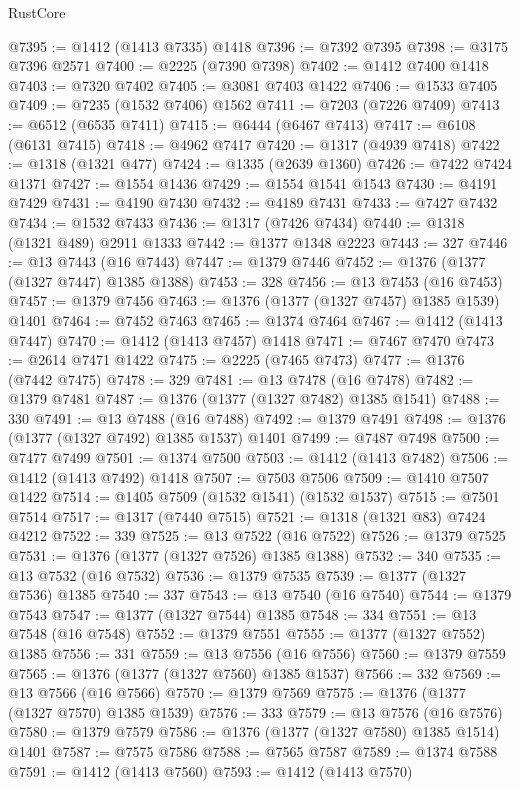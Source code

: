 \begin{lexlean}{RustCore}
\begin{coremodule}
@7395 := @1412 (@1413 @7335) @1418
@7396 := @7392 @7395
@7398 := @3175 @7396 @2571
@7400 := @2225 (@7390 @7398)
@7402 := @1412 @7400 @1418
@7403 := @7320 @7402
@7405 := @3081 @7403 @1422
@7406 := @1533 @7405
@7409 := @7235 (@1532 @7406) @1562
@7411 := @7203 (@7226 @7409)
@7413 := @6512 (@6535 @7411)
@7415 := @6444 (@6467 @7413)
@7417 := @6108 (@6131 @7415)
@7418 := @4962 @7417
@7420 := @1317 (@4939 @7418)
@7422 := @1318 (@1321 @477)
@7424 := @1335 (@2639 @1360)
@7426 := @7422 @7424 @1371
@7427 := @1554 @1436
@7429 := @1554 @1541 @1543
@7430 := @4191 @7429
@7431 := @4190 @7430
@7432 := @4189 @7431
@7433 := @7427 @7432
@7434 := @1532 @7433
@7436 := @1317 (@7426 @7434)
@7440 := @1318 (@1321 @489) @2911 @1333
@7442 := @1377 @1348 @2223
@7443 := 327
@7446 := @13 @7443 (@16 @7443)
@7447 := @1379 @7446
@7452 := @1376 (@1377 (@1327 @7447) @1385 @1388)
@7453 := 328
@7456 := @13 @7453 (@16 @7453)
@7457 := @1379 @7456
@7463 := @1376 (@1377 (@1327 @7457) @1385 @1539) @1401
@7464 := @7452 @7463
@7465 := @1374 @7464
@7467 := @1412 (@1413 @7447)
@7470 := @1412 (@1413 @7457) @1418
@7471 := @7467 @7470
@7473 := @2614 @7471 @1422
@7475 := @2225 (@7465 @7473)
@7477 := @1376 (@7442 @7475)
@7478 := 329
@7481 := @13 @7478 (@16 @7478)
@7482 := @1379 @7481
@7487 := @1376 (@1377 (@1327 @7482) @1385 @1541)
@7488 := 330
@7491 := @13 @7488 (@16 @7488)
@7492 := @1379 @7491
@7498 := @1376 (@1377 (@1327 @7492) @1385 @1537) @1401
@7499 := @7487 @7498
@7500 := @7477 @7499
@7501 := @1374 @7500
@7503 := @1412 (@1413 @7482)
@7506 := @1412 (@1413 @7492) @1418
@7507 := @7503 @7506
@7509 := @1410 @7507 @1422
@7514 := @1405 @7509 (@1532 @1541) (@1532 @1537)
@7515 := @7501 @7514
@7517 := @1317 (@7440 @7515)
@7521 := @1318 (@1321 @83) @7424 @4212
@7522 := 339
@7525 := @13 @7522 (@16 @7522)
@7526 := @1379 @7525
@7531 := @1376 (@1377 (@1327 @7526) @1385 @1388)
@7532 := 340
@7535 := @13 @7532 (@16 @7532)
@7536 := @1379 @7535
@7539 := @1377 (@1327 @7536) @1385
@7540 := 337
@7543 := @13 @7540 (@16 @7540)
@7544 := @1379 @7543
@7547 := @1377 (@1327 @7544) @1385
@7548 := 334
@7551 := @13 @7548 (@16 @7548)
@7552 := @1379 @7551
@7555 := @1377 (@1327 @7552) @1385
@7556 := 331
@7559 := @13 @7556 (@16 @7556)
@7560 := @1379 @7559
@7565 := @1376 (@1377 (@1327 @7560) @1385 @1537)
@7566 := 332
@7569 := @13 @7566 (@16 @7566)
@7570 := @1379 @7569
@7575 := @1376 (@1377 (@1327 @7570) @1385 @1539)
@7576 := 333
@7579 := @13 @7576 (@16 @7576)
@7580 := @1379 @7579
@7586 := @1376 (@1377 (@1327 @7580) @1385 @1514) @1401
@7587 := @7575 @7586
@7588 := @7565 @7587
@7589 := @1374 @7588
@7591 := @1412 (@1413 @7560)
@7593 := @1412 (@1413 @7570)

\end{coremodule}
\end{lexlean}
